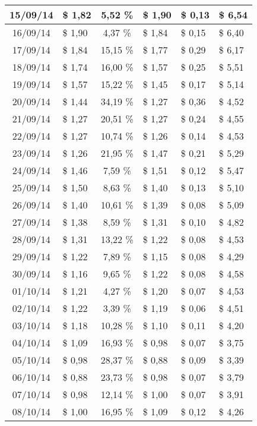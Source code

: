 \begin{center}
\begin{small}
\begin{longtable}{|c|l|c|l|l|l|}
15/09/14 & \$ 1,82 & 5,52 \% & \$ 1,90 & \$ 0,13 & \$ 6,54 \\ \hline
16/09/14 & \$ 1,90 & 4,37 \% & \$ 1,84 & \$ 0,15 & \$ 6,40 \\ \hline
17/09/14 & \$ 1,84 & 15,15 \% & \$ 1,77 & \$ 0,29 & \$ 6,17 \\ \hline
18/09/14 & \$ 1,74 & 16,00 \% & \$ 1,57 & \$ 0,25 & \$ 5,51 \\ \hline
19/09/14 & \$ 1,57 & 15,22 \% & \$ 1,45 & \$ 0,17 & \$ 5,14 \\ \hline
20/09/14 & \$ 1,44 & 34,19 \% & \$ 1,27 & \$ 0,36 & \$ 4,52 \\ \hline
21/09/14 & \$ 1,27 & 20,51 \% & \$ 1,27 & \$ 0,24 & \$ 4,55 \\ \hline
22/09/14 & \$ 1,27 & 10,74 \% & \$ 1,26 & \$ 0,14 & \$ 4,53 \\ \hline
23/09/14 & \$ 1,26 & 21,95 \% & \$ 1,47 & \$ 0,21 & \$ 5,29 \\ \hline
24/09/14 & \$ 1,46 & 7,59 \% & \$ 1,51 & \$ 0,12 & \$ 5,47 \\ \hline
25/09/14 & \$ 1,50 & 8,63 \% & \$ 1,40 & \$ 0,13 & \$ 5,10 \\ \hline
26/09/14 & \$ 1,40 & 10,61 \% & \$ 1,39 & \$ 0,08 & \$ 5,09 \\ \hline
27/09/14 & \$ 1,38 & 8,59 \% & \$ 1,31 & \$ 0,10 & \$ 4,82 \\ \hline
28/09/14 & \$ 1,31 & 13,22 \% & \$ 1,22 & \$ 0,08 & \$ 4,53 \\ \hline
29/09/14 & \$ 1,22 & 7,89 \% & \$ 1,15 & \$ 0,08 & \$ 4,29 \\ \hline
30/09/14 & \$ 1,16 & 9,65 \% & \$ 1,22 & \$ 0,08 & \$ 4,58 \\ \hline
01/10/14 & \$ 1,21 & 4,27 \% & \$ 1,20 & \$ 0,07 & \$ 4,53 \\ \hline
02/10/14 & \$ 1,22 & 3,39 \% & \$ 1,19 & \$ 0,06 & \$ 4,51 \\ \hline
03/10/14 & \$ 1,18 & 10,28 \% & \$ 1,10 & \$ 0,11 & \$ 4,20 \\ \hline
04/10/14 & \$ 1,09 & 16,93 \% & \$ 0,98 & \$ 0,07 & \$ 3,75 \\ \hline
05/10/14 & \$ 0,98 & 28,37 \% & \$ 0,88 & \$ 0,09 & \$ 3,39 \\ \hline
06/10/14 & \$ 0,88 & 23,73 \% & \$ 0,98 & \$ 0,07 & \$ 3,79 \\ \hline
07/10/14 & \$ 0,98 & 12,14 \% & \$ 1,00 & \$ 0,07 & \$ 3,91 \\ \hline
08/10/14 & \$ 1,00 & 16,95 \% & \$ 1,09 & \$ 0,12 & \$ 4,26 \\ \hline

\end{longtable}
\end{small}
\end{center}
